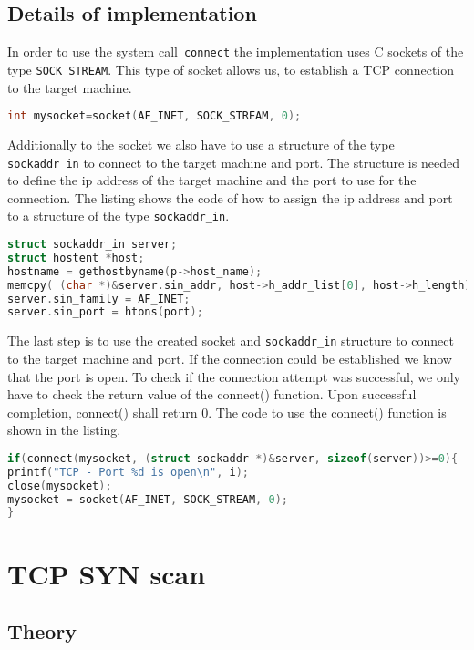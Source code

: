 \subsection{Details of implementation}
In order to use the system call~\lstinline{connect} the implementation uses C sockets of the type \lstinline|SOCK_STREAM|. This type
of socket allows us, to establish a TCP connection to the target machine.
\begin{lstlisting}[frame= single, language=C, caption=C code to create a TCP socket in C]
int mysocket=socket(AF_INET, SOCK_STREAM, 0);
\end{lstlisting}
Additionally to the socket we also have to use a structure of the type \lstinline|sockaddr_in| to connect to the target machine and port.
The structure is needed to define the ip address of the target machine and the port to use for the connection. The listing shows the
code of how to assign the ip address and port to a structure of the type \lstinline|sockaddr_in|. 
\begin{lstlisting}[frame= single, language=C, caption= C code to use the structure \lstinline|sockaddr_in|]
struct sockaddr_in server;
struct hostent *host;
hostname = gethostbyname(p->host_name);
memcpy( (char *)&server.sin_addr, host->h_addr_list[0], host->h_length);
server.sin_family = AF_INET;
server.sin_port = htons(port);
\end{lstlisting}
The last step is to use the created socket and  \lstinline|sockaddr_in| structure to connect to the target machine and port. If the 
connection could be established we know that the port is open. To check if the connection attempt was successful, we only have to
check the return value of the connect() function. Upon successful completion, connect() shall return 0. The code to use the connect() function is shown in the listing.
\begin{lstlisting}[frame= single, language=C, caption= C code to use the connect() to check if port is open]
if(connect(mysocket, (struct sockaddr *)&server, sizeof(server))>=0){
printf("TCP - Port %d is open\n", i);
close(mysocket);
mysocket = socket(AF_INET, SOCK_STREAM, 0);
}
\end{lstlisting}

\section{TCP SYN scan}
\label{sec:syn}
\subsection{Theory}



